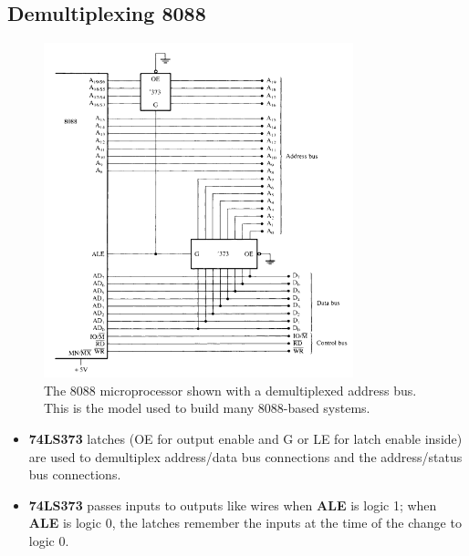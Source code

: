 \subsection{Demultiplexing 8088}
\begin{figure}[h!]
  \includegraphics[width = 0.8\textwidth]{./figures/8088_demux.png}
  \caption{The 8088 microprocessor shown with a demultiplexed address bus. This is the
model used to build many 8088-based systems.}
  \label{}
\end{figure}
\begin{itemize}
  \item \textbf{74LS373} latches (OE for output enable and G or LE for latch enable inside) are used to demultiplex address/data bus connections and the address/status bus connections.
  \item \textbf{74LS373} passes inputs to outputs like wires when \textbf{ALE} is logic 1; when \textbf{ALE} is logic 0, the latches remember the inputs at the time of the change to logic 0.
\end{itemize}

